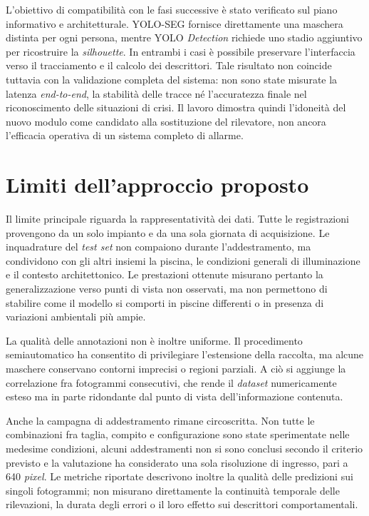L'obiettivo di compatibilità con le fasi successive è stato verificato sul piano informativo e architetturale. YOLO-SEG fornisce direttamente una maschera distinta per ogni persona, mentre YOLO \textit{Detection} richiede uno stadio aggiuntivo per ricostruire la \textit{silhouette}. In entrambi i casi è possibile preservare l'interfaccia verso il tracciamento e il calcolo dei descrittori. Tale risultato non coincide tuttavia con la validazione completa del sistema: non sono state misurate la latenza \textit{end-to-end}, la stabilità delle tracce né l'accuratezza finale nel riconoscimento delle situazioni di crisi. Il lavoro dimostra quindi l'idoneità del nuovo modulo come candidato alla sostituzione del rilevatore, non ancora l'efficacia operativa di un sistema completo di allarme.

\section{Limiti dell'approccio proposto}

Il limite principale riguarda la rappresentatività dei dati. Tutte le registrazioni provengono da un solo impianto e da una sola giornata di acquisizione. Le inquadrature del \textit{test set} non compaiono durante l'addestramento, ma condividono con gli altri insiemi la piscina, le condizioni generali di illuminazione e il contesto architettonico. Le prestazioni ottenute misurano pertanto la generalizzazione verso punti di vista non osservati, ma non permettono di stabilire come il modello si comporti in piscine differenti o in presenza di variazioni ambientali più ampie.

La qualità delle annotazioni non è inoltre uniforme. Il procedimento semiautomatico ha consentito di privilegiare l'estensione della raccolta, ma alcune maschere conservano contorni imprecisi o regioni parziali. A ciò si aggiunge la correlazione fra fotogrammi consecutivi, che rende il \textit{dataset} numericamente esteso ma in parte ridondante dal punto di vista dell'informazione contenuta.

Anche la campagna di addestramento rimane circoscritta. Non tutte le combinazioni fra taglia, compito e configurazione sono state sperimentate nelle medesime condizioni, alcuni addestramenti non si sono conclusi secondo il criterio previsto e la valutazione ha considerato una sola risoluzione di ingresso, pari a 640 \textit{pixel}. Le metriche riportate descrivono inoltre la qualità delle predizioni sui singoli fotogrammi; non misurano direttamente la continuità temporale delle rilevazioni, la durata degli errori o il loro effetto sui descrittori comportamentali.

